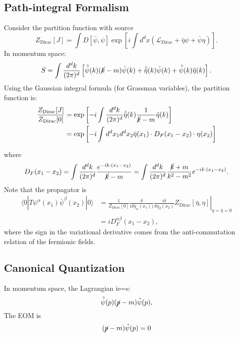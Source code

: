 \subsection{Path-integral Formalism}

Consider the partition function with source
\begin{equation}
	Z_{\mathrm{Dirac}}[J]
	= \int D[\bar\psi,\psi] \exp\left[i\int d^dx \left(\mathcal{L}_{\mathrm{Dirac}}+\bar{\eta}\psi + \bar\psi\eta \right) \right].
\end{equation}
In momentum space:
\begin{equation}
	S = \int\frac{d^d k}{(2\pi)^d} \left[
		\tilde{\bar\psi}(k)(\cancel{k}-m)\tilde{\psi}(k) +
		\tilde{\bar\eta}(k) \tilde{\psi}(k) +
		\tilde{\bar\psi}(k) \tilde{\eta}(k)
	\right].
\end{equation}
Using the Gaussian integral formula (for Grassman variables), the partition function is:
\begin{equation}
\begin{aligned}
	\frac{Z_{\mathrm{Dirac}}[J]}{Z_{\mathrm{Dirac}}[0]}
	&= \exp\left[-i\int \frac{d^d k}{(2\pi)^d} \tilde{\bar\eta}(k)\frac{1}{\cancel{k}-m}\tilde\eta(k)\right] \\
	&= \exp\left[-i\int d^dx_1 d^d x_2 \bar{\eta}(x_1)\cdot D_F(x_1-x_2)\cdot \eta(x_2) \right]
\end{aligned}
\end{equation}

where
\begin{equation}
	D_F(x_1-x_2) = \int \frac{d^d k}{(2\pi)^d} \frac{e^{-i k \cdot (x_1-x_2)}}{\cancel{k}-m}
	= \int \frac{d^d k}{(2\pi)^d} \frac{\cancel{k}+m}{k^2-m^2} e^{-i k \cdot (x_1-x_2)}.
\end{equation}
Note that the propagator is
\begin{equation}
\begin{aligned}
	\langle 0| T \psi^\alpha(x_1) \bar\psi^\beta(x_2) |0\rangle
	&= \left.\frac{1}{Z_{\mathrm{Dirac}}[0]}\frac{\delta}{i\delta \bar{\eta}_\alpha(x_1))}\frac{i\delta}{\delta\eta_\beta(x_2)} Z_{\mathrm{Dirac}}[\bar\eta,\eta]\right|_{\eta=\bar\eta=0} \\
	&= i D^{\alpha\beta}_F(x_1-x_2),
\end{aligned}
\end{equation}
where the sign in the variational derivative comes from the anti-commutation relation of the fermionic fields.


\subsection{Canonical Quantization}
In momentum space, the Lagrangian ie=s:
\begin{equation*}
	\tilde{\bar \psi}(p)(\cancel{p} - m)\tilde\psi(p),
\end{equation*}
The EOM is
\begin{equation}
	(\cancel p -m)\tilde\psi(p) = 0
\end{equation}


